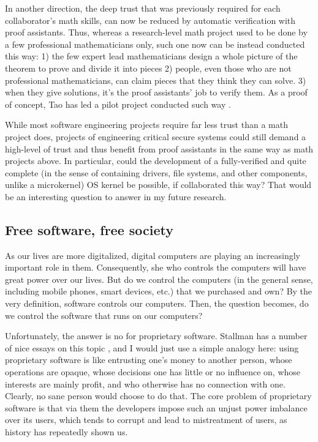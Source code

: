 \documentclass[10pt]{article}
\begin{document}
In another direction, the deep trust that was previously required for each
collaborator's math skills, can now be reduced by automatic verification with
proof assistants. Thus, whereas a research-level math project used to be done
by a few professional mathematicians only, such one now can be instead
conducted this way: 1) the few expert lead mathematicians design a whole picture
of the theorem to prove and divide it into pieces 2) people, even those who are
not professional mathematicians, can claim pieces that they think they can
solve. 3) when they give solutions, it's the proof assistants' job to verify
them. As a proof of concept, Tao has led a pilot project conducted such way
\cite{tao.pilot.project}.

While most software engineering projects require far less trust than a
math project does, projects of engineering critical secure systems could
still demand a high-level of trust and thus benefit from proof assistants in
the same way as math projects above. In particular, could the development of a
fully-verified and quite complete (in the sense of containing drivers, file
systems, and other components, unlike a microkernel) OS kernel be possible, if
collaborated this way? That would be an interesting question to answer in my
future research.

\subsection[Free software, free society]{
Free software, free society\protect\footnotemark}

As our lives are more digitalized, digital computers are playing an
increasingly important role in them. Consequently, she who controls the
computers will have great power over our lives. But do we control the computers
(in the general sense, including mobile phones, smart devices, etc.) that we
purchased and own? By the very definition, software controls our computers.
Then, the question becomes, do we control the software that runs on our
computers?

Unfortunately, the answer is no for proprietary software. Stallman
has a number of nice essays on this topic \cite{stallman.essays}, and I would
just use a simple analogy here: using proprietary software is like entrusting
one's money to another person, whose operations are opaque, whose decisions one
has little or no influence on, whose interests are mainly profit, and who
otherwise has no connection with one. Clearly, no sane person would choose to
do that.  The core problem of proprietary software is that via them the
developers impose such an unjust power imbalance over its users, which tends to
corrupt and lead to mistreatment of users, as history has repeatedly shown us.
\end{document}

